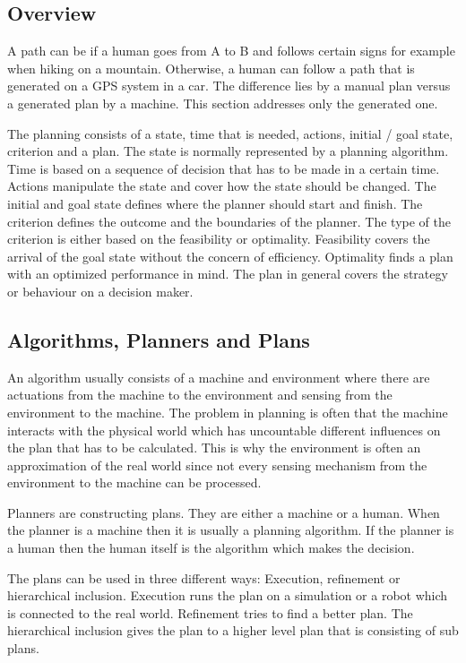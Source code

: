 \subsection{Overview}
A path can be if a human goes from A to B and follows certain signs for example when hiking on a mountain. Otherwise, a human can follow a path that is generated on a GPS system in a car. The difference lies by a manual plan versus a generated plan by a machine. This section addresses only the generated one.

The planning consists of a state, time that is needed, actions, initial / goal state, criterion and a plan. The state is normally represented by a planning algorithm. Time is based on a sequence of decision that has to be made in a certain time. Actions manipulate the state and cover how the state should be changed. The initial and goal state defines where the planner should start and finish.
The criterion defines the outcome and the boundaries of the planner. The type of the criterion is either based on the feasibility or optimality. Feasibility covers the arrival of the goal state without the concern of efficiency. Optimality finds a plan with an optimized performance in mind. The plan in general covers the strategy or behaviour on a decision maker.
\cite{planning_algorithms_steven_m_lavalle}

\subsection{Algorithms, Planners and Plans}
An algorithm usually consists of a machine and environment where there are actuations from the machine to the environment and sensing from the environment to the machine. The problem in planning is often that the machine interacts with the physical world which has uncountable different influences on the plan that has to be calculated. This is why the environment is often an approximation of the real world since not every sensing mechanism from the environment to the machine can be processed.

Planners are constructing plans. They are either a machine or a human. When the planner is a machine then it is usually a planning algorithm. If the planner is a human then the human itself is the algorithm which makes the decision.

The plans can be used in three different ways: Execution, refinement or hierarchical inclusion. Execution runs the plan on a simulation or a robot which is connected to the real world. Refinement tries to find a better plan. The hierarchical inclusion gives the plan to a higher level plan that is consisting of sub plans.

